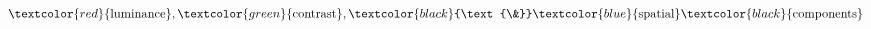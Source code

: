 \documentclass[preview]{standalone}
\begin{document}
\begin{align*}
\textcolor{red}{\text{luminance}}, \textcolor{green}{\text{contrast}}, \textcolor{black}{\text{\&}} \textcolor{blue}{\text{spatial}} \textcolor{black}{\text{components}}
\end{align*}
\end{document}

